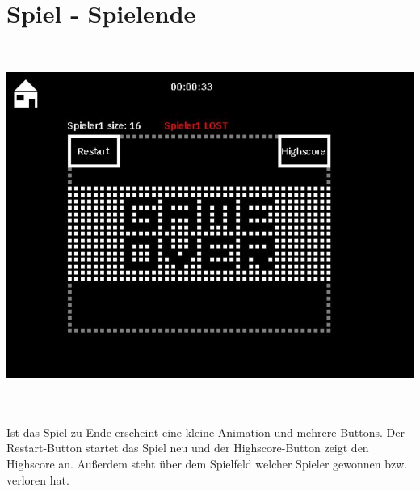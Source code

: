 \section{Spiel - Spielende}
\label{Spiel_-_Spielende}
%
\textcolor{white}{easily}
\newline 
\begin{minipage}[X]{1.1\textwidth}
 \centering
 \includegraphics[scale=0.5]{bilder/Spielende}
 \label{fig:spielende}
\end{minipage}
\\ \\ 
	Ist das Spiel zu Ende erscheint eine kleine Animation und mehrere Buttons. Der Restart-Button startet das Spiel neu und der Highscore-Button zeigt den Highscore an. Au{\ss}erdem steht {\"u}ber dem Spielfeld welcher Spieler gewonnen bzw. verloren hat.  

%
